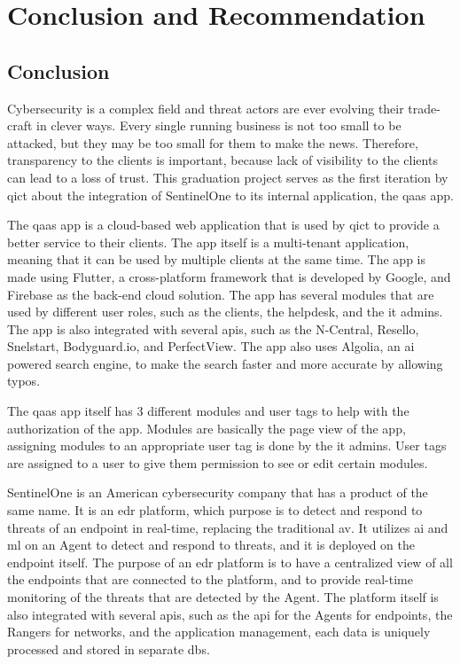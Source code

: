 \chapter{Conclusion and Recommendation}
\section{Conclusion}
Cybersecurity is a complex field and threat actors are ever evolving their trade-craft in clever ways. Every single
running business is not too small to be attacked, but they may be too small for them to make the news. Therefore, transparency
to the clients is important, because lack of visibility to the clients can lead to a loss of trust. This graduation project serves
as the first iteration by \acrshort{qict} about the integration of SentinelOne to its internal application, the \acrshort{qaas} app.

The \acrshort{qaas} app is a cloud-based web application that is used by \acrshort{qict} to provide a better service to their clients.
The app itself is a multi-tenant application, meaning that it can be used by multiple clients at the same time. The app is made
using Flutter, a cross-platform framework that is developed by Google, and Firebase as the back-end cloud solution. The app
has several modules that are used by different user roles, such as the clients, the helpdesk, and the \acrshort{it} admins. The app
is also integrated with several \acrshort{api}s, such as the N-Central, Resello, Snelstart, Bodyguard.io, and PerfectView. The app
also uses Algolia, an \acrshort{ai} powered search engine, to make the search faster and more accurate by allowing typos.

The \acrshort{qaas} app itself has 3 different modules and user tags to help with the authorization of the app.
Modules are basically the page view of the app, assigning modules to an appropriate user tag is done by the \acrshort{it} admins. User
tags are assigned to a user to give them permission to see or edit certain modules.

SentinelOne is an American cybersecurity company that has a product of the same name. It is an \acrshort{edr}
platform, which purpose is to detect and respond to threats of an endpoint in real-time, replacing the traditional \acrshort{av}.
It utilizes \acrshort{ai} and \acrshort{ml} on an Agent to detect and respond to threats, and it is deployed on the endpoint itself.
The purpose of an \acrshort{edr} platform is to have a centralized view of all the endpoints that are connected to the platform, and
to provide real-time monitoring of the threats that are detected by the Agent. The platform itself is also integrated with several
\acrshort{api}s, such as the \acrshort{api} for the Agents for endpoints, the Rangers for networks, and the application management,
each data is uniquely processed and stored in separate \acrshort{db}s.

